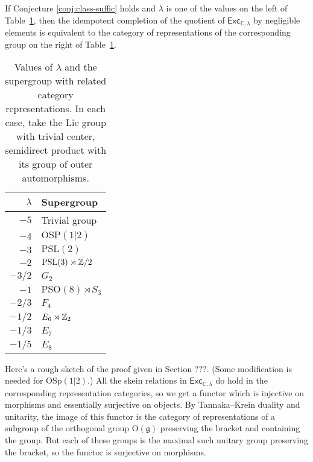 \documentclass[12pt]{amsart}
\begin{document}
\begin{proposition}
If Conjecture \ref{conj:class-suffic} holds and $\lambda$ is one of
the values on the left of Table~\ref{tab:lambda-group}, then the
idempotent completion of the quotient of
$\mathsf{Exc}_{\mathbb{C},\lambda}$ by negligible elements is equivalent
to the category of representations of the corresponding group on the
right of Table~\ref{tab:lambda-group}.
\end{proposition}

\begin{table}
  \begin{tabular}{rl}
    \toprule
    $\lambda$ & Supergroup \\ \midrule
    $-5$ & Trivial group \\
    $-4$ & $\mathrm{OSP}(1|2)$ \\
    $-3$ & $\mathrm{PSL}(2)$ \\
    $-2$ & $\mathrm{PSL}(3) \rtimes \mathbb Z/2$ \\
    $-3/2$ & $G_2$ \\
    $-1$ & $\mathrm{PSO}(8) \rtimes S_3$ \\
    $-2/3$ & $F_4$ \\
    $-1/2$ & $E_6 \rtimes \mathbb Z_2$ \\
    $-1/3$ & $E_7$ \\
    $-1/5$ & $E_8$ \\
    \bottomrule
  \end{tabular}
  \caption{Values of $\lambda$ and the supergroup with related category
    representations. In each case, take the Lie group
    with trivial center, semidirect product with its group of outer
    automorphisms.}
  \label{tab:lambda-group}
\end{table}

Here's a rough sketch of the proof given in Section ???. (Some modification is
needed for $\mathrm{OSp}(1|2)$.)  All the skein relations in
$\mathsf{Exc}_{\mathbb{C},\lambda}$ do hold in the corresponding
representation categories, so we get a functor which is injective on morphisms
and essentially surjective on objects.  By Tannaka--Krein duality and
unitarity, the image of this functor is the category of representations of a
subgroup of the orthogonal group $\mathrm{O}(\mathfrak{g})$ preserving the bracket and containing
the group.  But each of these groups is the maximal such unitary group
preserving the bracket, so the functor is surjective on morphisms.

\end{document}
